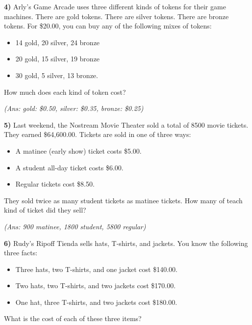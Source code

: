 \documentclass[10pt,letterpaper]{memoir}
\begin{document}
{\bfseries\large 4)} 
Arly's Game Arcade uses three different kinds of tokens for their game machines.
There are gold tokens.
There are silver tokens.
There are bronze tokens.
For \$20.00, you can buy any of the following mixes of tokens:
\begin{itemize}[itemsep=0in]
    \item 14 gold, 20 silver, 24 bronze
    \item 20 gold, 15 silver, 19 bronze
    \item 30 gold, 5 silver, 13 bronze.
\end{itemize}
How much does each kind of token cost?

\myWideMatrixTable[-0.1in]

\vspace{0.5in}
\hfill{\itshape (Ans: gold: \$0.50, silver: \$0.35, bronze: \$0.25)}
\vspace{2em}




\newpage
{\bfseries\large 5)} 
Last weekend, the Nostream Movie Theater sold a total of 8500 movie tickets.
They earned \$64,600.00.
Tickets are sold in one of three ways:
\begin{itemize}
    \item A matinee (early show) ticket costs \$5.00.
    \item A student all-day ticket costs \$6.00.
    \item Regular tickets cost \$8.50.
\end{itemize}
They sold twice as many student tickets as matinee tickets.
How many of teach kind of ticket did they sell?

\myWideMatrixTable[-0.1in]

\vspace{0.5in}
\hfill{\itshape (Ans: 900 matinee, 1800 student, 5800 regular)}
\vspace{2em}




{\bfseries\large 6)} 
Rudy's Ripoff Tienda sells hats, T-shirts, and jackets. 
You know the following three facts:
\begin{itemize}[itemsep=0in]
    \item Three hats, two T-shirts, and one jacket cost \$140.00.
    \item Two hats, two T-shirts, and two jackets cost \$170.00.
    \item One hat, three T-shirts, and two jackets cost \$180.00.
\end{itemize}
What is the cost of each of these three items?
\end{document}
